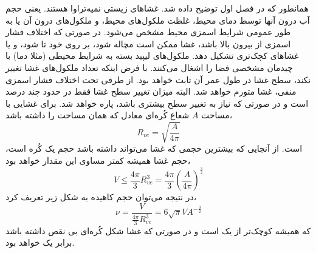 همانطور که در فصل اول توضیح داده شد. غشاهای زیستی نمیه‌تراوا هستند. یعنی حجم آب درون آنها توسط دمای محیط، غلظت ملکول‌های محیط، و ملکول‌های درون آن یا به طور عمومی شرایط اسمزی محیط مشخص می‌شود. در صورتی که اختلاف فشار اسمزی از بیرون بالا باشد، غشا ممکن است مچاله شود، بر روی خود تا شود، و یا غشا‌های کچک‌تری تشکیل دهد. ملکول‌های لیپید بسته به شرایط محیطی (مثلا دما) با چیدمان مشخصی فضا را اشغال می‌کنند. با فرض اینکه تعداد ملکول‌های غشا تغییر نکند، سطح غشا در طول عمر آن ثابت خواهد بود. از طرفی تحت اختلاف فشار اسمزی منفی، غشا متورم خواهد شد. البته میزان تغییر سطح غشا فقط در حدود چند درصد است و در صورتی که نیاز به تغییر سطح بیشتری باشد، پاره خواهد شد. برای غشایی با مساحت
$A$
شعاع کُره‌ای معادل که همان مساحت را داشته باشد،
\begin{equation}
R_{ve}=\sqrt{\frac{A}{4\pi}}
\end{equation}
است. از آنجایی که بیشترین حجمی که غشا می‌تواند داشته باشد حجم یک کُره‌ است، حجم غشا همیشه کمتر مساوی این مقدار خواهد بود،
\begin{equation}
V\leq\frac{4\pi}{3}R_{ve}^3=\frac{4\pi}{3}\left(\frac{A}{4\pi}\right)^{\frac{3}{2}}
\end{equation}
در نتیجه می‌توان حجم کاهیده به شکل زیر تعریف کرد،
\begin{equation}
\nu=\frac{V}{\frac{4\pi}{3}R_{ve}^3}=6\sqrt{\pi}VA^{-\frac{3}{2}}
\label{eq:reducedVolume}
\end{equation}
که همیشه کوچک‌تر از یک است و در صورتی که غشا شکل کُره‌ای بی نقص داشته باشد برابر یک خواهد بود.
